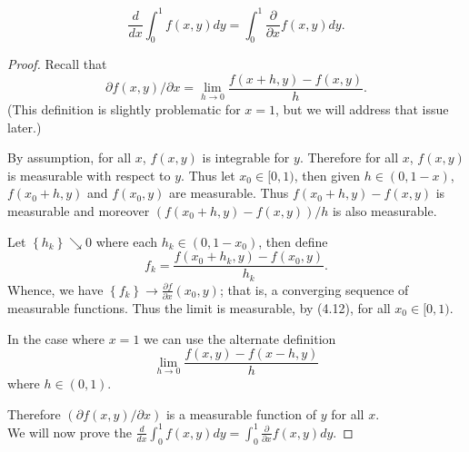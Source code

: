 \documentclass[12pt]{book}
\newcommand{\set}[1]{\left\{ #1 \right\}}
\renewcommand{\.}{\mkern1mu}
\newcounter{case}
\newenvironment{pf}{\begin{proof}\setlength{\parindent}{\normalparindent}\setlength{\parskip}{\normalparskip}}{\end{proof}}
\theoremstyle{theorem}
\newlength{\normalparindent}
\newlength{\normalparskip}
\begin{document}
		\[ \frac{d}{dx}\int_0^1 f(x,y) dy = \int_0^1 \frac{\partial}{\partial x} f(x,y) dy. \]
		\begin{pf}
			Recall that 
				\[ \partial f(x,y)/\partial x = \lim_{h\to 0} \frac{f(x+h,y) - f(x,y)}{h}. \]
			(This definition is slightly problematic for $x =1$, but we will address that issue later.) 
			
			By assumption, for all $x$, $f(x,y)$ is integrable for $y$. Therefore for all $x$, $f(x,y)$ is measurable with respect to $y$. Thus let $x_0 \in [0,1)$, then given $h \in (0,1-x)$, $f(x_0+h, y)$ and $f(x_0, y)$ are measurable. Thus $f(x_0 + h, y) - f(x,y)$ is measurable and moreover $(f(x_0+h, y) - f(x,y))/h$ is also measurable. 
			
			Let $\set{h_k}\searrow 0$ where each $h_k \in (0,1-x_0)$, then define 
				\[ f_k = \frac{f(x_0 + h_k, y) - f(x_0, y)}{h_k}. \]
			Whence, we have $\set{f_k} \to \frac{\partial f}{\partial x}(x_0, y)$; that is, a converging sequence of measurable functions. Thus the limit is measurable, by (4.12), for all $x_0 \in [0,1)$.
			
			In the case where $x=1$ we can use the alternate definition
				\[ \lim_{h\to 0} \frac{f(x,y) - f(x-h, y)}{h} \]
			where $h\in (0,1)$. \
			
			Therefore $(\partial f(x,y)/ \partial x)$ is a measurable function of $y$ for all $x$.\\
			
			We will now prove the $\frac{d}{dx}\int_0^1 f(x,y) dy = \int_0^1 \frac{\partial}{\partial x} f(x,y) dy$.
		\end{pf}
		
\end{document}
